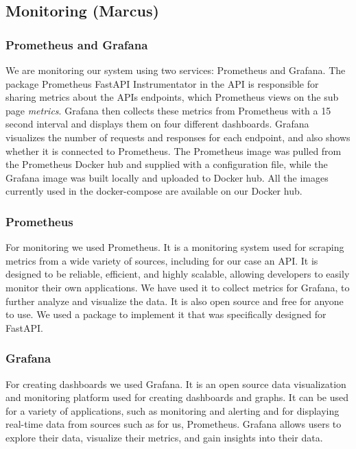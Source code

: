 \documentclass{article}
\begin{document}
\subsection{Monitoring (Marcus)}
\subsubsection{Prometheus and Grafana}
We are monitoring our system using two services: Prometheus and Grafana. The package Prometheus FastAPI Instrumentator in the API is responsible for sharing metrics about the APIs endpoints, which Prometheus views on the sub page \textit{metrics}. Grafana then collects these metrics from Prometheus with a 15 second interval and displays them on four different dashboards. Grafana visualizes the number of requests and responses for each endpoint, and also shows whether it is connected to Prometheus. The Prometheus image was pulled from the Prometheus Docker hub and supplied with a configuration file, while the Grafana image was built locally and uploaded to Docker hub. All the images currently used in the docker-compose are available on our Docker hub.

\subsubsection{Prometheus}
For monitoring we used Prometheus. It is a monitoring system used for scraping metrics from a wide variety of sources, including for our case an API. It is designed to be reliable, efficient, and highly scalable, allowing developers to easily monitor their own applications. We have used it to collect metrics for Grafana, to further analyze and visualize the data. It is also open source and free for anyone to use. We used a package to implement it that was specifically designed for FastAPI. 

\subsubsection{Grafana}
For creating dashboards we used Grafana. It is an open source data visualization and monitoring platform used for creating dashboards and graphs. It can be used for a variety of applications, such as monitoring and alerting and for displaying real-time data from sources such as for us, Prometheus. Grafana allows users to explore their data, visualize their metrics, and gain insights into their data.
\end{document}
